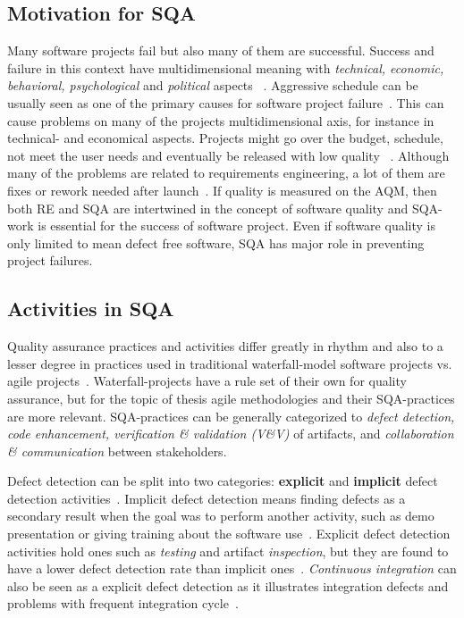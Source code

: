     \subsection{Motivation for SQA}
    Many software projects fail but also many of them are successful. Success and failure in this context have multidimensional meaning with
    \textit{technical, economic, behavioral, psychological} and \textit{political} aspects ~\cite{mcleod2011factors}. Aggressive
    schedule can be usually seen as one of the primary causes for software project failure~\cite{cerpa2009did}. This can cause
    problems on many of the projects multidimensional axis, for instance in technical- and economical aspects. Projects might go
    over the budget, schedule, not meet the user needs and eventually be released with low quality ~\cite{cerpa2009did}.
    Although many of the problems are related to requirements engineering, a lot of them are fixes or rework needed after launch~\cite{lessons}.
    If quality is measured on the AQM, then both RE and SQA are intertwined in the concept of software quality and SQA-work
    is essential for the success of software project. Even if software quality is only limited to mean defect free software, SQA has
    major role in preventing project failures.

    \subsection{Activities in SQA}
    Quality assurance practices and activities differ greatly in rhythm and also to a lesser degree in practices used in
    traditional waterfall-model software projects vs. agile projects~\cite{huo2004software}. Waterfall-projects have a rule set
    of their own for quality assurance, but for the topic of thesis agile methodologies and their SQA-practices are more relevant.
    SQA-practices can be generally categorized to \textit{defect detection, code enhancement, verification \& validation (V\&V)} of artifacts,
    and \textit{collaboration \& communication} between stakeholders.

    Defect detection can be split into two categories: \textbf{explicit} and \textbf{implicit} defect detection activities~\cite{mantyla2014software}.
    Implicit defect detection means finding defects as a secondary result when the goal was to perform another activity,
    such as demo presentation or giving training about the software use~\cite{mantyla2014software}. Explicit defect detection activities
    hold ones such as \textit{testing} and artifact \textit{inspection}, but they are found to have a lower
    defect detection rate than implicit ones~\cite{mantyla2014software}. \textit{Continuous integration} can also be seen
    as a explicit defect detection as it illustrates integration defects and problems with frequent integration cycle~\cite{huo2004software}.

